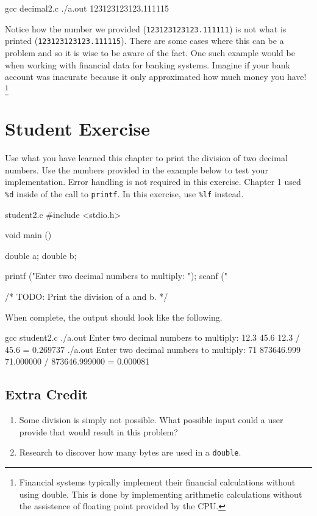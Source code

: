 \begin{Terminal}
gcc decimal2.c
./a.out
123123123123.111115
\end{Terminal}

Notice how the number we provided (\verb|123123123123.111111|) is not what is
printed (\verb|123123123123.111115|).  There are some cases where this can be a
problem and so it is wise to be aware of the fact.  One such example would be
when working with financial data for banking systems.  Imagine if your bank
account was inacurate because it only approximated how much money you have!
\footnote{Financial systems typically implement their financial calculations
without using double. This is done by implementing arithmetic calculations
without the assistence of floating point provided by the CPU.}


\section{Student Exercise}

Use what you have learned this chapter to print the division of two decimal
numbers. Use the numbers provided in the example below to test your
implementation. Error handling is not required in this exercise. Chapter 1 used
\verb|%d| inside of the call to \verb|printf|. In this exercise, use \verb|%lf|
instead.

\begin{code}{student2.c}
#include <stdio.h>

void main ()
{
    double a;
    double b;

    printf ("Enter two decimal numbers to multiply: ");
    scanf ("%

    /* TODO: Print the division of a and b. */
}
\end{code}

When complete, the output should look like the following.

\begin{Terminal}
gcc student2.c
./a.out
Enter two decimal numbers to multiply: 12.3 45.6
12.3 / 45.6 = 0.269737
./a.out
Enter two decimal numbers to multiply: 71 873646.999
71.000000 / 873646.999000 = 0.000081
\end{Terminal}

\subsection{Extra Credit}

\begin{enumerate}
\item Some division is simply not possible. What possible input could a user provide
that would result in this problem?
\item Research to discover how many bytes are used in a \verb|double|.
\end{enumerate}
